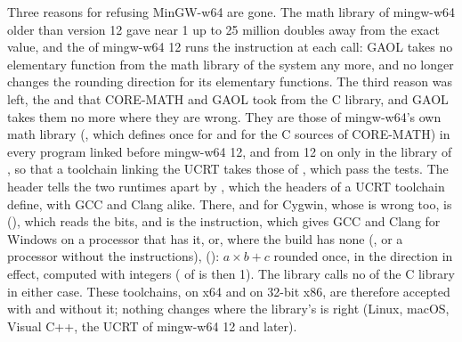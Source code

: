 \begin{Rem}
Three reasons for refusing MinGW-w64 are gone.\newinvfive{} The math library
of mingw-w64 older than version 12 gave  near 1 up to 25 million
doubles away from the exact value, and the  of mingw-w64 12
runs the instruction  at each call: GAOL takes no elementary
function from the math library of the system any more, and no longer changes
the rounding direction for its elementary functions. The third reason was left,
the  and  that CORE-MATH and GAOL took from the C
library, and GAOL takes them no more where they are wrong. They are those of
mingw-w64's own math library (, which
 defines once for 
and for the C sources of CORE-MATH) in every program linked before mingw-w64 12,
and from 12 on only in the library of , so that a toolchain
linking the UCRT takes those of , which pass the tests. The
header tells the two runtimes apart by , which the headers of a
UCRT toolchain define, with GCC and Clang alike. There, and for Cygwin, whose
 is wrong too,  is 
(), which reads the bits, and  is the
instruction, which  gives GCC and Clang for Windows on a
processor that has it, or, where the build has none (, or
a processor without the instructions), 
(): $a\times b + c$ rounded once, in the direction
in effect, computed with integers ( of
 is then 1). The library calls no  of
the C library in either case. These toolchains, on x64 and on 32-bit x86, are
therefore accepted with  and without it; nothing changes where
the library's  is right (Linux, macOS, Visual C++, the UCRT of
mingw-w64 12 and later).


\end{Rem}
